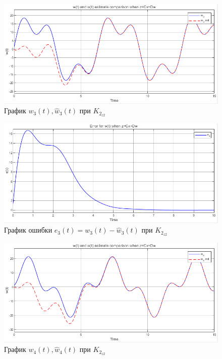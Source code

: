 \documentclass[a4paper, 12pt]{article}
\begin{document}
    \begin{figure}[H]
        \centering
        \includegraphics[scale=0.75]{3task_wwh3cd.png}
        \captionsetup{skip=0pt}
        \caption{График $w_3(t),\hat{w}_3(t)$ при $K_{2_{z2}}$}
        \label{fig:3task_wwh3cd}
    \end{figure}
    \begin{figure}[H]
        \centering
        \includegraphics[scale=0.75]{3task_we3cd.png}
        \captionsetup{skip=0pt}
        \caption{График ошибки $e_3(t)=w_3(t)-\hat{w}_3(t)$ при $K_{2_{z2}}$}
        \label{fig:3task_we3cd}
    \end{figure}
    \begin{figure}[H]
        \centering
        \includegraphics[scale=0.75]{3task_wwh4cd.png}
        \captionsetup{skip=0pt}
        \caption{График $w_4(t),\hat{w}_4(t)$ при $K_{2_{z2}}$}
        \label{fig:3task_wwh4cd}
    \end{figure}
\end{document}
